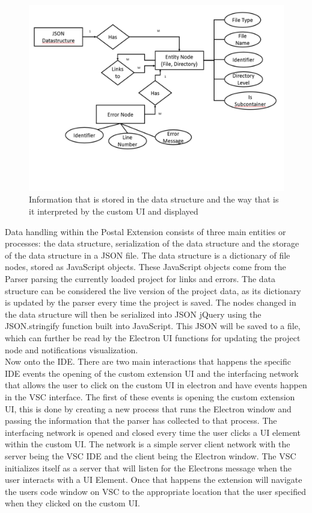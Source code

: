 \documentclass[letterpaper,10pt,titlepage,draftclsnofoot,onecolumn,onesided] {IEEEtran}
\begin{document}
\begin{figure}[h]
	\centering
	\includegraphics[width=.75\textwidth]{UpdatedDataStruct-eps-converted-to}
	\caption{Information that is stored in the data structure and the way that is it interpreted by the custom UI and displayed}
\end{figure}

Data handling within the Postal Extension consists of three main entities or processes: the data structure, serialization of the data structure and the storage of the data structure in a JSON file.
The data structure is a dictionary of file nodes, stored as JavaScript objects. 
These JavaScript objects come from the Parser parsing the currently loaded project for links and errors.
The data structure can be considered the live version of the project data, as its dictionary is updated by the parser every time the project is saved. 
The nodes changed in the data structure will then be serialized into JSON jQuery using the JSON.stringify function built into JavaScript. 
This JSON will be saved to a file, which can further be read by the Electron UI functions for updating the project node and notifications visualization. \\

Now onto the IDE. 
There are two main interactions that happens the specific IDE events the opening of the custom extension UI and the interfacing network that allows the user to click on the custom UI in electron and have events happen in the VSC interface. 
The first of these events is opening the custom extension UI, this is done by creating a new process that runs the Electron window and passing the information that the parser has collected to that process.  
The interfacing network is opened and closed every time the user clicks a UI element within the custom UI. 
The network is a simple server client network with the server being the VSC IDE and the client being the Electron window. 
The VSC initializes itself as a server that will listen for the Electrons message when the user interacts with a UI Element. 
Once that happens the extension will navigate the users code window on VSC to the appropriate location that the user specified when they clicked on the custom UI.  \\
\end{document}
